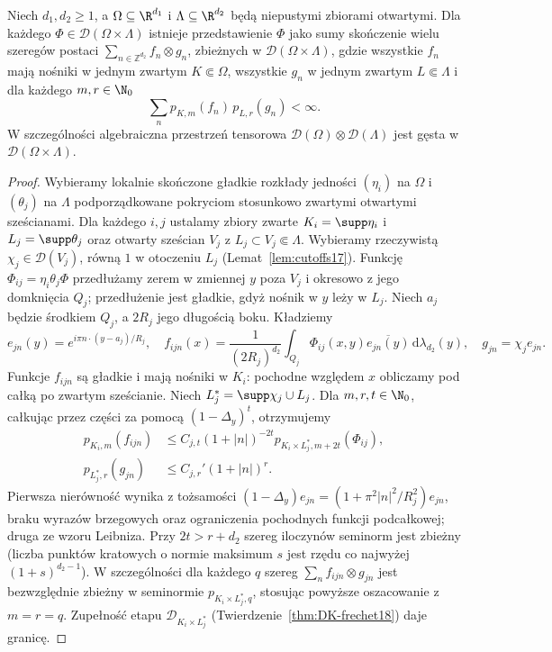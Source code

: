 \begin{lemat}
\label{lem:tensor-density23}
Niech $d_1,d_2\ge1$, a $\Omega\subseteq\R^{d_1}$ i
$\Lambda\subseteq\R^{d_2}$ będą niepustymi zbiorami otwartymi.
Dla każdego $\Phi\in\mathcal D(\Omega\times\Lambda)$
istnieje przedstawienie $\Phi$ jako sumy skończenie
wielu szeregów postaci
$\sum_{n\in\mathbb Z^{d_2}}f_n\otimes g_n$,
zbieżnych w $\mathcal D(\Omega\times\Lambda)$,
gdzie wszystkie $f_n$ mają nośniki w jednym zwartym
$K\Subset\Omega$, wszystkie $g_n$ w jednym zwartym
$L\Subset\Lambda$ i dla każdego $m,r\in\N_0$
\[
 \sum_n p_{K,m}(f_n)\,p_{L,r}(g_n)<\infty.
\]
W szczególności algebraiczna przestrzeń tensorowa
$\mathcal D(\Omega)\otimes\mathcal D(\Lambda)$
jest gęsta w $\mathcal D(\Omega\times\Lambda)$.
\end{lemat}
\begin{proof}
Wybieramy lokalnie skończone gładkie rozkłady jedności
$(\eta_i)$ na $\Omega$ i $(\theta_j)$ na $\Lambda$
podporządkowane pokryciom stosunkowo zwartymi otwartymi
sześcianami. Dla każdego $i,j$ ustalamy zbiory zwarte
$K_i=\supp\eta_i$ i $L_j=\supp\theta_j$ oraz otwarty
sześcian $V_j$ z $L_j\subset V_j\Subset\Lambda$.
Wybieramy rzeczywistą $\chi_j\in\mathcal D(V_j)$,
równą $1$ w otoczeniu $L_j$ (Lemat~\ref{lem:cutoffs17}).
Funkcję $\Phi_{ij}=\eta_i\theta_j\Phi$ przedłużamy
zerem w zmiennej $y$ poza $V_j$ i okresowo z jego
domknięcia $Q_j$; przedłużenie jest gładkie,
gdyż nośnik w $y$ leży w $L_j$.
Niech $a_j$ będzie środkiem $Q_j$, a $2R_j$ jego
długością boku. Kładziemy
\[
 e_{jn}(y)=e^{i\pi n\cdot(y-a_j)/R_j},
 \quad
 f_{ijn}(x)=\frac{1}{(2R_j)^{d_2}}
 \int_{Q_j}\Phi_{ij}(x,y)\overline{e_{jn}(y)}
 \,\mathrm d\lambda_{d_2}(y),
 \quad g_{jn}=\chi_j e_{jn}.
\]
Funkcje $f_{ijn}$ są gładkie i mają nośniki w $K_i$:
pochodne względem $x$ obliczamy pod całką po zwartym
sześcianie. Niech $L_j^*=\supp\chi_j\cup L_j$.
Dla $m,r,t\in\N_0$, całkując przez części za pomocą
$(1-\Delta_y)^t$, otrzymujemy
\[
 \begin{aligned}
 p_{K_i,m}(f_{ijn})&\le C_{j,t}
 (1+|n|)^{-2t}p_{K_i\times L_j^*,m+2t}(\Phi_{ij}),\\
 p_{L_j^*,r}(g_{jn})&\le C_{j,r}'(1+|n|)^r .
 \end{aligned}
\]
Pierwsza nierówność wynika z tożsamości
$(1-\Delta_y)e_{jn}=(1+\pi^2|n|^2/R_j^2)e_{jn}$,
braku wyrazów brzegowych oraz ograniczenia pochodnych
funkcji podcałkowej; druga ze wzoru Leibniza.
Przy $2t>r+d_2$ szereg iloczynów seminorm jest zbieżny
(liczba punktów kratowych o normie maksimum $s$
jest rzędu co najwyżej $(1+s)^{d_2-1}$).
W szczególności dla każdego $q$ szereg
$\sum_n f_{ijn}\otimes g_{jn}$ jest bezwzględnie
zbieżny w seminormie $p_{K_i\times L_j^*,q}$,
stosując powyższe oszacowanie z $m=r=q$.
Zupełność etapu $\mathcal D_{K_i\times L_j^*}$
(Twierdzenie~\ref{thm:DK-frechet18}) daje granicę.


\end{proof}
